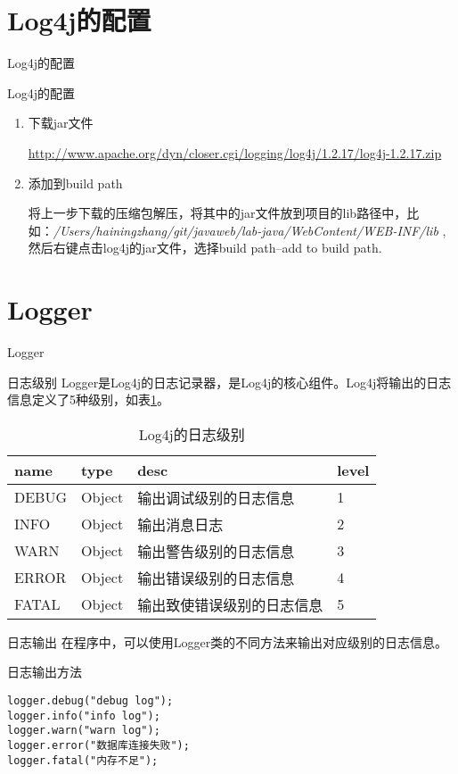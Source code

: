 \documentclass{beamer}
\begin{document}
\section{Log4j的配置}
\begin{frame}
\Huge{\centerline{Log4j的配置}}
\end{frame}
\begin{frame}{Log4j的配置}
\begin{enumerate}
\item
下载jar文件

\url{http://www.apache.org/dyn/closer.cgi/logging/log4j/1.2.17/log4j-1.2.17.zip}
\item
添加到build path

将上一步下载的压缩包解压，将其中的jar文件放到项目的lib路径中，比如：\emph{/Users/hainingzhang/git/javaweb/lab-java/WebContent/WEB-INF/lib} ,然后右键点击log4j的jar文件，选择build path--add to build path.
\end{enumerate}
\end{frame}
\section{Logger}
\begin{frame}
\Huge{\centerline{Logger}}
\end{frame}
\begin{frame}{日志级别}
Logger是Log4j的日志记录器，是Log4j的核心组件。Log4j将输出的日志信息定义了5种级别，如表\ref{loggerLevel}。
\begin{table}
\begin{tabular}{llll}
\toprule
\textbf{name}&\textbf{type}&\textbf{desc}&\textbf{level}\\
\midrule
DEBUG&Object&输出调试级别的日志信息&1\\
INFO&Object&输出消息日志&2\\
WARN&Object&输出警告级别的日志信息&3\\
ERROR&Object&输出错误级别的日志信息&4\\
FATAL&Object&输出致使错误级别的日志信息&5\\
\bottomrule
\end{tabular}
\caption{Log4j的日志级别}
\label{loggerLevel}
\end{table}

\end{frame}

\begin{frame}[fragile]{日志输出}
在程序中，可以使用Logger类的不同方法来输出对应级别的日志信息。
\begin{block}{日志输出方法}
\begin{verbatim}
logger.debug("debug log");
logger.info("info log");
logger.warn("warn log");
logger.error("数据库连接失败");
logger.fatal("内存不足");
\end{verbatim}
\end{block}
\end{frame}
\end{document}

